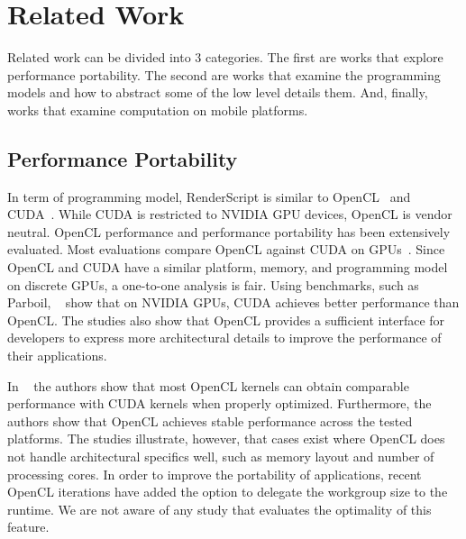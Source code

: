 \section{Related Work}
\label{sec:related}

Related work can be divided into $3$ categories.
The first are works that explore performance portability.
The second are works that examine the programming models and how to abstract some of the low level details them.
And, finally, works that examine computation on mobile platforms.

\subsection{Performance Portability}

In term of programming model, RenderScript is similar to OpenCL~\cite{OpenCL}
and CUDA~\cite{CUDA:Programming-Guide}. While CUDA is restricted to NVIDIA GPU devices, OpenCL is vendor neutral. OpenCL performance and performance portability
has been extensively evaluated.  Most evaluations compare OpenCL against CUDA on GPUs~\cite{fang2011comprehensive,
weber2011comparing, van2011correlating, vassilev2010comparison,
amorim2009comparing, karimi2010performance, komatsu2010evaluating}.  Since OpenCL and CUDA have a similar platform, memory, and programming model on discrete GPUs, a 
one-to-one analysis is fair.  Using benchmarks, such as Parboil, ~\cite{weber2011comparing,
van2011correlating, vassilev2010comparison, amorim2009comparing} show that on NVIDIA GPUs, CUDA achieves better performance than OpenCL. 
The studies also show that OpenCL
provides a sufficient interface for developers to express more architectural
details to improve the performance of their applications. 

In ~\cite{komatsu2010evaluating,fang2011comprehensive,dolbeau2013one} the authors show that
most OpenCL kernels can obtain comparable performance with CUDA kernels when
properly optimized.
Furthermore, the authors show that OpenCL
achieves stable performance across the tested platforms. The studies illustrate, however, that cases exist where OpenCL does not handle
architectural specifics well, such as memory layout and number of processing
cores. In order to improve the portability of applications, recent OpenCL
iterations have added the option to delegate the workgroup size to the runtime.
We are not aware of any study that evaluates the optimality of this feature.


